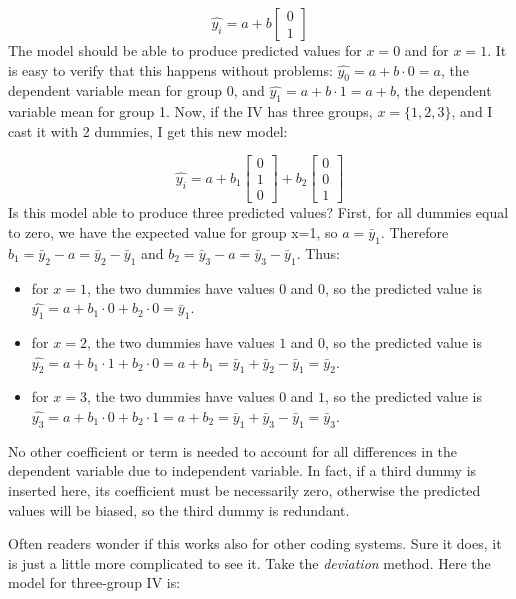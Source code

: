 \documentclass[
]{book}
\begin{document}
\[
\hat{y_i}=a+b \begin{bmatrix}
0 \\
1
\end{bmatrix}
\]
The model should be able to produce predicted values for \(x=0\) and for \(x=1\). It is easy to verify that this happens without problems: \(\hat{y_0}=a+b \cdot 0=a\), the dependent variable mean for group 0, and \(\hat{y_1}=a+b \cdot 1=a+b\), the dependent variable mean for group 1. Now, if the IV has three groups, \(x=\{1,2,3\}\), and I cast it with 2 dummies, I get this new model:

\[
\hat{y_i}=a+b_1 \begin{bmatrix}
0 \\
1 \\
0
\end{bmatrix} +b_2 \begin{bmatrix}
0 \\
0 \\
1
\end{bmatrix}
\]
Is this model able to produce three predicted values? First, for all dummies equal to zero, we have the expected value for group x=1, so \(a=\bar{y}_1\). Therefore \(b_1=\bar{y}_2-a=\bar{y}_2-\bar{y}_1\) and \(b_2=\bar{y}_3-a=\bar{y}_3-\bar{y}_1\). Thus:

\begin{itemize}
\item
  for \(x=1\), the two dummies have values \(0\) and \(0\), so the predicted value is \(\hat{y_1}=a+b_1 \cdot 0 +b_2 \cdot 0 =\bar{y}_1\).
\item
  for \(x=2\), the two dummies have values \(1\) and \(0\), so the predicted value is \(\hat{y_2}=a+b_1 \cdot 1 +b_2 \cdot 0 =a+b_1=\bar{y}_1+\bar{y}_2-\bar{y}_1=\bar{y}_2\).
\item
  for \(x=3\), the two dummies have values \(0\) and \(1\), so the predicted value is \(\hat{y_3}=a+b_1 \cdot 0 +b_2 \cdot 1 =a+b_2=\bar{y}_1+\bar{y}_3-\bar{y}_1=\bar{y}_3\).
\end{itemize}

No other coefficient or term is needed to account for all differences in the dependent variable due to independent variable. In fact, if a third dummy is inserted here, its coefficient must be necessarily zero, otherwise the predicted values will be biased, so the third dummy is redundant.

Often readers wonder if this works also for other coding systems. Sure it does, it is just a little more complicated to see it. Take the \emph{deviation} method. Here the model for three-group IV is:
\end{document}

